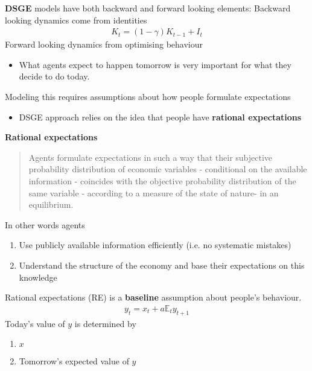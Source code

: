 \documentclass{beamer}
\begin{document}
\begin{frame}
  \textbf{DSGE} models have both backward and forward looking elements:
  Backward looking dynamics come from identities
  \begin{align}
     K_t= (1-\gamma) K_{t-1} + I_t
   \end{align} 
  Forward looking dynamics from optimising behaviour
  \begin{itemize}
    \item What agents expect to happen tomorrow is very important for what they decide to do today.
  \end{itemize}
  Modeling this requires assumptions about how people formulate expectations
  \begin{itemize}
    \item DSGE approach relies on the idea that people have \textbf{rational expectations}
  \end{itemize}
\end{frame}

\begin{frame}
  \textbf{Rational expectations} 
   \begin{quote}
     Agents formulate expectations in such a way that their subjective probability distribution of economic variables - conditional on the available information - coincides with the objective probability distribution of the same variable - according to a measure of the state of nature- in an equilibrium.
   \end{quote}
   \medskip
   In other words agents
    \begin{enumerate}
    \item Use publicly available information efficiently (i.e. no systematic mistakes)
    \item Understand the structure of the economy and base their expectations on this knowledge
  \end{enumerate}
\end{frame}

\begin{frame}
  Rational expectations (RE) is a \textbf{baseline} assumption about people's behaviour.
  \begin{align}
    y_t=x_t + a\mathbb{E}_ty_{t+1}
  \end{align}
  Today's value of $y$ is determined by  
\begin{enumerate}
  \item $x$
  \item Tomorrow's expected value of $y$
\end{enumerate}
\end{frame}
\end{document}
